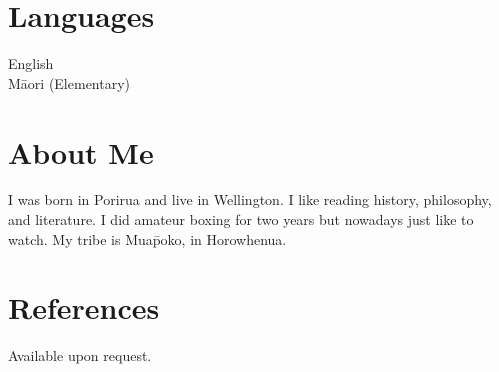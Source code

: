 \documentclass[margin,line]{res}
\begin{document}
\begin{resume}
\section{\sc Languages}
English\\
M\=aori (Elementary)

\section{\sc About Me}
I was born in Porirua and live in Wellington. I like reading history, philosophy, and literature. I did amateur boxing for two years but nowadays just like to watch. My tribe is Mua\=poko, in Horowhenua.

\section{\sc References}
Available upon request.

\end{resume}
\end{document}
